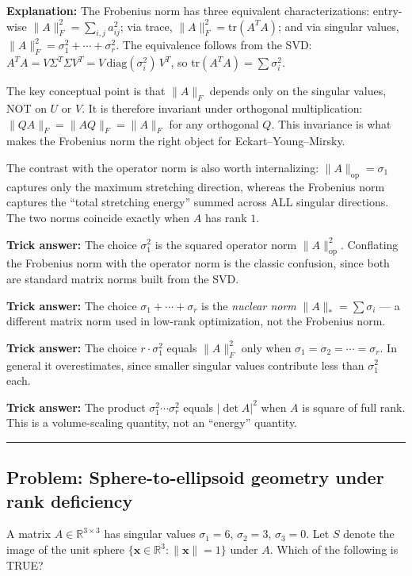 \documentclass[12pt]{amsart}
\newcommand{\divider}{
  \vspace{-1em}
  \noindent
  \raisebox{-0.15ex}{\textbullet}%
  \hspace{0.5em}%
  \rule[0.5ex]{0.95\textwidth}{1.0pt}%
  \hspace{0.5em}%
  \raisebox{-0.15ex}{\textbullet}%
  \vspace{0em}
}
\begin{document}
\textbf{Explanation:}
The Frobenius norm has three equivalent characterizations:
entry-wise $\|A\|_F^2 = \sum_{i,j} a_{ij}^2$;
via trace, $\|A\|_F^2 = \mathrm{tr}(A^TA)$;
and via singular values, $\|A\|_F^2 = \sigma_1^2 + \cdots + \sigma_r^2$.
The equivalence follows from the SVD: $A^TA = V\Sigma^T\Sigma V^T = V\,\mathrm{diag}(\sigma_i^2)\,V^T$,
so $\mathrm{tr}(A^TA) = \sum \sigma_i^2$.

The key conceptual point is that $\|A\|_F$ depends only on the singular values, NOT on
$U$ or $V$. It is therefore invariant under orthogonal multiplication:
$\|QA\|_F = \|AQ\|_F = \|A\|_F$ for any orthogonal $Q$. This invariance is what
makes the Frobenius norm the right object for Eckart--Young--Mirsky.

The contrast with the operator norm is also worth internalizing: $\|A\|_{\mathrm{op}} = \sigma_1$
captures only the maximum stretching direction, whereas the Frobenius norm
captures the ``total stretching energy'' summed across ALL singular directions.
The two norms coincide exactly when $A$ has rank $1$.

\textbf{Trick answer:}
The choice $\sigma_1^2$ is the squared operator norm $\|A\|_{\mathrm{op}}^2$.
Conflating the Frobenius norm with the operator norm is the classic confusion,
since both are standard matrix norms built from the SVD.

\textbf{Trick answer:}
The choice $\sigma_1 + \cdots + \sigma_r$ is the \emph{nuclear norm}
$\|A\|_* = \sum \sigma_i$ --- a different matrix norm used in low-rank
optimization, not the Frobenius norm.

\textbf{Trick answer:}
The choice $r \cdot \sigma_1^2$ equals $\|A\|_F^2$ only when
$\sigma_1 = \sigma_2 = \cdots = \sigma_r$. In general it overestimates,
since smaller singular values contribute less than $\sigma_1^2$ each.

\textbf{Trick answer:}
The product $\sigma_1^2 \cdots \sigma_r^2$ equals $|\det A|^2$ when $A$ is square
of full rank. This is a volume-scaling quantity, not an ``energy'' quantity.

\divider

\subsection*{Problem: Sphere-to-ellipsoid geometry under rank deficiency}

A matrix $A \in \mathbb{R}^{3 \times 3}$ has singular values
$\sigma_1 = 6$, $\sigma_2 = 3$, $\sigma_3 = 0$.
Let $S$ denote the image of the unit sphere
$\{\mathbf{x} \in \mathbb{R}^3 : \|\mathbf{x}\| = 1\}$ under $A$.
Which of the following is TRUE?
\end{document}
